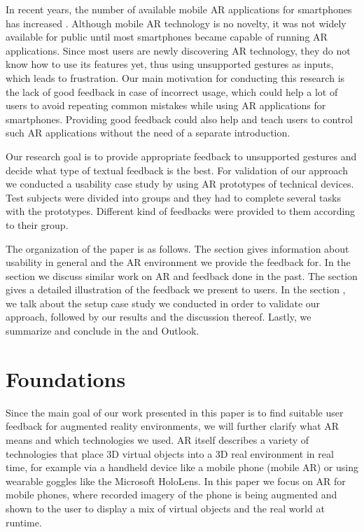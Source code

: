 \documentclass[11pt, a4paper]{article}
\begin{document}
		In recent years, the number of available mobile \ac{AR} applications for smartphones
		has increased \cite{Tractica2017}. Although mobile \ac{AR} technology is no novelty, it was not widely
		available for {public until most smartphones became} capable of running \ac{AR} applications.
		Since most users are newly discovering \ac{AR} technology, they {do not} know how to use its features
		yet, thus using unsupported gestures as {inputs}, which leads to frustration. Our main motivation
		for conducting this research is the lack of good feedback in case of incorrect usage, which could
		help a lot of users to avoid repeating common mistakes while using \ac{AR} applications for smartphones.
		Providing good feedback could also help and teach users to control such \ac{AR} applications
		without the need of a separate introduction.

		Our research goal is to provide appropriate feedback to unsupported gestures and decide
		what type of textual feedback is the best. {For validation of our approach we conducted a
		usability case study by using \ac{AR} prototypes of technical devices. Test subjects were divided 
		into groups and they had to complete several tasks with the prototypes. Different kind of 
		feedbacks were provided to them according to their group.}

		The organization of the paper is as follows. The section  gives information about
		usability in general and the \ac{AR} environment we provide the feedback for. In the section  we discuss similar work on \ac{AR} and feedback done in the past. The  section
		gives a detailed illustration of the feedback we present to users. In the section , we
		talk about the setup case study we conducted in order to validate our approach, followed by
		our results and the discussion thereof. Lastly, we summarize and conclude in the  and
		Outlook.


	\pagestyle{myheadings}
	\section*{Foundations}\label{sec:foundations}
		Since the main goal of our work presented in this paper is to find suitable user feedback for augmented reality environments, we will further clarify what \ac{AR} means and which technologies we used. \ac{AR} itself describes a variety of technologies that place 3D virtual objects into a 3D real environment in real time, for example via a handheld device like a mobile phone (mobile \ac{AR}) or using wearable goggles like the Microsoft HoloLens. In this paper we focus on \ac{AR} for mobile phones, where recorded imagery of the phone is being augmented and shown to the user to display a mix of virtual objects and the real world at runtime.
\end{document}
